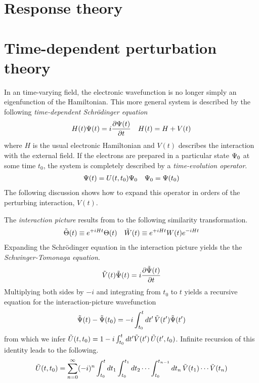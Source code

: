 \documentclass[11pt]{article}
\numberwithin{equation}{section}
\begin{document}
\setlength{\abovedisplayskip}{5pt}
\setlength{\belowdisplayskip}{5pt}


\setcounter{section}{8}
\section{Response theory}


\newpage
\appendix

\section{Time-dependent perturbation theory}

\begin{rmk}
In an time-varying field, the electronic wavefunction is no longer simply an eigenfunction of the Hamiltonian.
This more general system is described by the following \textit{time-dependent Schr\"odinger equation}
\begin{align}
\label{eq:schrodinger-equation}
  H(t)
  \Psi (t)
=
  i
  \frac {\partial\Psi (t)}{\partial t}
&&
  H(t)
=
  H
+
  V(t)
\end{align}
where $H$ is the usual electronic Hamiltonian and $V(t)$ describes the interaction with the external field.
If the electrons are prepared in a particular state $\Psi _0$ at some time $t_0$, the system is completely described by a \textit{time-evolution operator}.
\begin{align}
  \Psi (t)=U(t,t_0)\Psi _0
&&
  \Psi _0
=
  \Psi (t_0)
\end{align}
The following discussion shows how to expand this operator in orders of the perturbing interaction, $V(t)$.
\end{rmk}

\begin{dfn}
The \textit{interaction picture} results from to the following similarity transformation.
\begin{align}
  \tilde{\Theta }(t)
\equiv
  e^{+iHt}
  \Theta (t)
&&
  \tilde{W}(t)
\equiv
  e^{+iHt}
  W(t)
  e^{-iHt}
\end{align}
Expanding the Schr\"odinger equation in the interaction picture yields the the \textit{Schwinger-Tomonaga equation}.
\begin{align}
\label{eq:schwinger-tomonaga}
  \tilde{V}(t)
  \tilde{\Psi }(t)
=
  i
  \frac {\partial\tilde{\Psi }(t)}{\partial t}
\end{align}
Multiplying both sides by $-i$ and integrating from $t_0$ to $t$ yields a recursive equation for the interaction-picture wavefunction
\begin{align}
\label{eq:integrated-schwinger-tomonaga-equation}
  \tilde{\Psi }(t)
-
  \tilde{\Psi }(t_0)
=
-
  i
  \int_{t_0}^t
  dt'\,
  \tilde{V}(t')
  \tilde{\Psi }(t')
\end{align}
from which we infer
$
  \tilde{U}(t,t_0)
=
  1
-
  i
  \int_{t_0}^t
  dt'
  \tilde{V}(t')\,
  \tilde{U}(t',t_0)
$.
Infinite recursion of this identity leads to the following.
\begin{align}
  \tilde{U}(t,t_0)
=
  \sum_{n=0}^\infty
  (-i)^n
  \int_{t_0}^t
  dt_1
  \int_{t_0}^{t_1}
  dt_2
  \cdots
  \int_{t_0}^{t_{n-1}}
  dt_n
  \,
  \tilde{V}(t_1)
  \cdots
  \tilde{V}(t_n)
\end{align}
\end{dfn}
\end{document}
